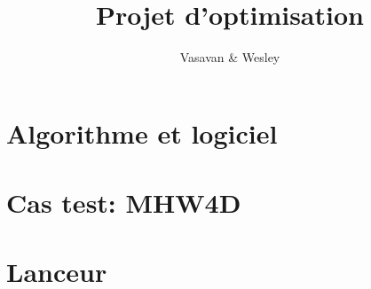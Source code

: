 \documentclass[a4paper]{article}
\title{Projet d'optimisation}
\author{Vasavan \& Wesley}
\begin{document}
\maketitle
\newpage
\protect\hypertarget{table}{}
\renewcommand{\contentsname}{Sommaire}
\tableofcontents
\newpage
\newpage

\section{Algorithme et logiciel}

\section{Cas test: MHW4D}

\section{Lanceur}
\end{document}
